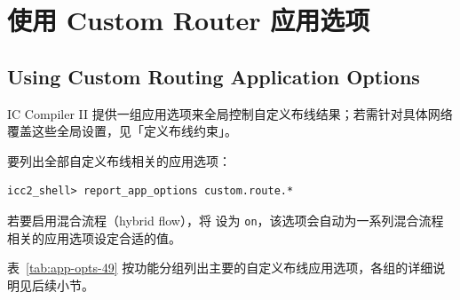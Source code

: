 \section{使用 Custom Router 应用选项}
\subsection*{Using Custom Routing Application Options}

IC Compiler II 提供一组应用选项来全局控制自定义布线结果；若需针对具体网络覆盖这些全局设置，见「定义布线约束」。

要列出全部自定义布线相关的应用选项：
\begin{lstlisting}
icc2_shell> report_app_options custom.route.*
\end{lstlisting}

若要启用混合流程（hybrid flow），将  设为 \texttt{on}，该选项会自动为一系列混合流程相关的应用选项设定合适的值。

表~\ref{tab:app-opts-49} 按功能分组列出主要的自定义布线应用选项，各组的详细说明见后续小节。


